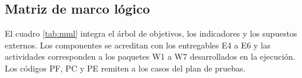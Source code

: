 \subsection{Matriz de marco lógico}
El cuadro \ref{tab:mml} integra el árbol de objetivos, los indicadores y los supuestos externos. Los componentes se acreditan con los entregables E4 a E6 y las actividades corresponden a los paquetes W1 a W7 desarrollados en la ejecución. Los códigos PF, PC y PE remiten a los casos del plan de pruebas.

\par
\begingroup\footnotesize{}\renewcommand{\arraystretch}{1.1}\setlength{\tabcolsep}{3.5pt}\setlength{\LTpre}{0pt}
\label{tab:mml}\nopagebreak
